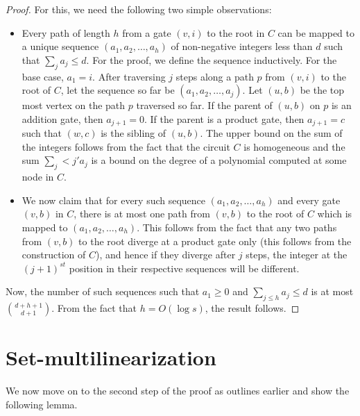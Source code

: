 \begin{proof}
For this, we need the following two simple observations:
\begin{itemize}
\item Every path of length $h$ from a gate $(v, i)$ to the root in $C$ can be mapped to a unique sequence $(a_1, a_2, \ldots, a_h)$ 
of non-negative integers less than $d$ such that $\sum_j a_j \leq d$. For the proof, we define the sequence inductively. For the base case, $a_1 = i$. After traversing $j$ steps along a path $p$ from $(v,i)$ to the root of $C$, let the sequence so far be $(a_1, a_2, \ldots, a_j)$. Let $(u, b)$ be the top most vertex on the path $p$ traversed so far. If  the parent of $(u, b)$ on $p$ is an addition gate, then $a_{j+1} = 0$. If the parent is a product gate, then $a_{j+1} = c$ such that $(w,c)$ is the sibling of $(u,b)$. The upper bound on the sum of the integers follows from the fact that the circuit $C$ is homogeneous and the sum $\sum_j<j' a_j$ is a bound on the degree of a polynomial computed at some node in $C$.

\item We now claim that for every such sequence $(a_1, a_2, \ldots, a_h)$ and every gate $(v,b)$ in $C$, there is at most one path from $(v,b)$ to the root of $C$ which is mapped to $(a_1, a_2, \ldots, a_h)$. This follows from the fact that any two paths from $(v,b)$ to the root diverge at a product gate only (this follows from the construction of $C$), and hence if they diverge after $j$ steps, the integer at the $(j+1)^{st}$ position in their respective sequences will be different.  
\end{itemize}

Now, the number of such sequences  such that $a_1 \geq 0$ and $\sum_{j \leq h}a_j \leq d$ is at most ${d + h + 1\choose d+1}$. From the fact that $h = O(\log s)$, the result follows. 
\end{proof}

\section{Set-multilinearization}
We now move on to the second step of the proof as outlines earlier and show the following lemma. 

